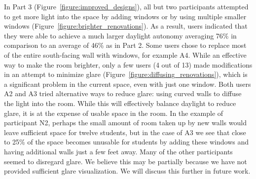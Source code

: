 \documentclass[review]{vgtc}                 %
\begin{document}
In Part 3 (Figure~\ref{figure:improved_designs}), all but two
participants attempted to get more light into the space by adding
windows or by using multiple smaller windows
(Figure~\ref{figure:brighter_renovations}).  As a result, users
indicated that they were able to achieve a much larger daylight autonomy
averaging 76\% in comparison to an average of 46\% as in Part 2.  Some
users chose to replace most of the entire south-facing wall with
windows, for example A4.  While an effective way to make the room
brighter, only a few users (4 out of 13) made modifications in an
attempt to minimize glare (Figure~\ref{figure:diffusing_renovations}),
which is a significant problem in the current space, even with just
one window.  Both users A2 and A3 tried alternative ways to reduce
glare: using curved walls to diffuse the light into the room.  While
this will effectively balance daylight to reduce glare, it is at the
expense of usable space in the room.  In the example of participant
N2, perhaps the small amount of room taken up by new walls would leave
sufficient space for twelve students, but in the case of A3 we see
that close to 25\% of the space becomes unusable for students by
adding these windows and having additional walls just a few feet away.
Many of the other participants seemed to disregard glare.  We believe
this may be partially because we have not provided sufficient glare
visualization.  We will discuss this further in future work.


\end{document}
